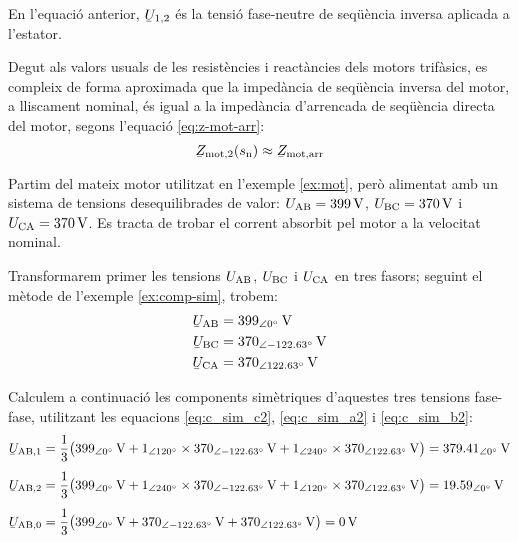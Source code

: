 En l'equació anterior, $\cmplx{U}_{1,2}$ és la tensió  fase-neutre de seqüència inversa aplicada a l’estator.

Degut als valors usuals de les resistències i reactàncies dels motors trifàsics, es compleix de forma aproximada que la impedància de seqüència inversa del motor, a lliscament nominal,  és igual a la impedància d'arrencada de seqüència directa del motor, segons l'equació \eqref{eq:z-mot-arr}:
\begin{equation}
	\cmplx{Z}\ped{mot,2}(s\ped{n}) \approx \cmplx{Z}\ped{mot,arr}\label{eq:Zarr-aprox-Z2}
\end{equation}


\begin{exemple}
	Partim del mateix motor utilitzat en l'exemple \vref{ex:mot}, però alimentat amb un sistema de tensions desequilibrades de valor: $U_\mathrm{AB} =
	\SI{399}{V}$, $U_\mathrm{BC} = \SI{370}{V}$ i
	$U_\mathrm{CA} = \SI{370}{V}$. Es tracta de trobar el corrent absorbit pel motor a la velocitat nominal.
	
	Transformarem primer les tensions $U_\mathrm{AB}$, $U_\mathrm{BC}$ i $U_\mathrm{CA}$ en tres fasors; seguint el mètode de l'exemple \vref{ex:comp-sim}, trobem:
	\begin{align*}
		\cmplx{U}\ped{AB} &= \SIpd{399}{0}{V} \\
		\cmplx{U}\ped{BC} &= \SIpd{370}{-122,63}{V} \\
		\cmplx{U}\ped{CA} &= \SIpd{370}{122,63}{V}
	\end{align*}
	
	Calculem a continuació les components simètriques d'aquestes tres tensions fase-fase, utilitzant les equacions
	\eqref{eq:c_sim_c2}, \eqref{eq:c_sim_a2} i \eqref{eq:c_sim_b2}:
	\begin{align*}
	\cmplx{U}\ped{AB,1} &= \frac{1}{3} \big(
	\SIpd{399}{0}{V} + \numpd{1}{120} \times \SIpd{370}{-122,63}{V} +
	\numpd{1}{240} \times \SIpd{370}{122,63}{V}\big) = \SIpd{379,41}{0}{V} \\[1ex]
	\cmplx{U}\ped{AB,2} &= \frac{1}{3} \big(
	\SIpd{399}{0}{V} + \numpd{1}{240} \times \SIpd{370}{-122,63}{V} +
	\numpd{1}{120} \times \SIpd{370}{122,63}{V} \big) = \SIpd{19,59}{0}{V} \\[1ex]
	\cmplx{U}\ped{AB,0} &= \frac{1}{3} \big(
	\SIpd{399}{0}{V} + \SIpd{370}{-122,63}{V} + \SIpd{370}{122,63}{V}\big) = \SI{0}{V}
	\end{align*}
	

\end{exemple}
